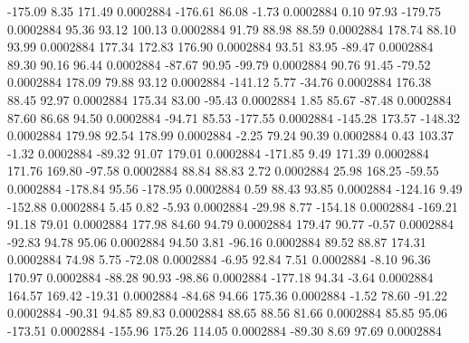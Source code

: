      -175.09        8.35      171.49     0.0002884
     -176.61       86.08       -1.73     0.0002884
        0.10       97.93     -179.75     0.0002884
       95.36       93.12      100.13     0.0002884
       91.79       88.98       88.59     0.0002884
      178.74       88.10       93.99     0.0002884
      177.34      172.83      176.90     0.0002884
       93.51       83.95      -89.47     0.0002884
       89.30       90.16       96.44     0.0002884
      -87.67       90.95      -99.79     0.0002884
       90.76       91.45      -79.52     0.0002884
      178.09       79.88       93.12     0.0002884
     -141.12        5.77      -34.76     0.0002884
      176.38       88.45       92.97     0.0002884
      175.34       83.00      -95.43     0.0002884
        1.85       85.67      -87.48     0.0002884
       87.60       86.68       94.50     0.0002884
      -94.71       85.53     -177.55     0.0002884
     -145.28      173.57     -148.32     0.0002884
      179.98       92.54      178.99     0.0002884
       -2.25       79.24       90.39     0.0002884
        0.43      103.37       -1.32     0.0002884
      -89.32       91.07      179.01     0.0002884
     -171.85        9.49      171.39     0.0002884
      171.76      169.80      -97.58     0.0002884
       88.84       88.83        2.72     0.0002884
       25.98      168.25      -59.55     0.0002884
     -178.84       95.56     -178.95     0.0002884
        0.59       88.43       93.85     0.0002884
     -124.16        9.49     -152.88     0.0002884
        5.45        0.82       -5.93     0.0002884
      -29.98        8.77     -154.18     0.0002884
     -169.21       91.18       79.01     0.0002884
      177.98       84.60       94.79     0.0002884
      179.47       90.77       -0.57     0.0002884
      -92.83       94.78       95.06     0.0002884
       94.50        3.81      -96.16     0.0002884
       89.52       88.87      174.31     0.0002884
       74.98        5.75      -72.08     0.0002884
       -6.95       92.84        7.51     0.0002884
       -8.10       96.36      170.97     0.0002884
      -88.28       90.93      -98.86     0.0002884
     -177.18       94.34       -3.64     0.0002884
      164.57      169.42      -19.31     0.0002884
      -84.68       94.66      175.36     0.0002884
       -1.52       78.60      -91.22     0.0002884
      -90.31       94.85       89.83     0.0002884
       88.65       88.56       81.66     0.0002884
       85.85       95.06     -173.51     0.0002884
     -155.96      175.26      114.05     0.0002884
      -89.30        8.69       97.69     0.0002884
